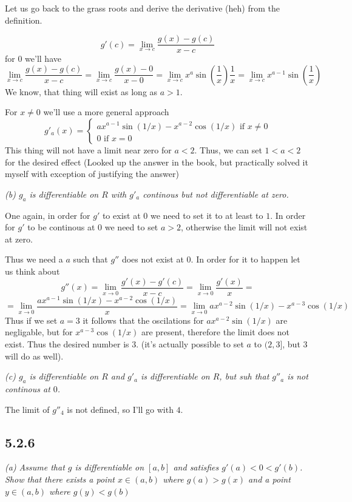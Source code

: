 \documentclass[11pt,oneside,titlepage]{book}
\begin{document}
Let us go back to the grass roots and derive the derivative (heh) from the
definition.

$$g'(c) = \lim_{x \to c}\frac{g(x) - g(c)}{x - c}$$
for 0 we'll have
$$\lim_{x \to c}\frac{g(x) - g(c)}{x - c} =
\lim_{x \to c}\frac{g(x) - 0}{x - 0} =
\lim_{x \to c}x^a\sin(\frac{1}{x}) \frac{1}{x} =
\lim_{x \to c}x^{a - 1}\sin(\frac{1}{x}) $$
We know, that thing will exist as long as $a > 1$.

For $x \neq 0$ we'll use a more general approach
\begin{equation}
  g'_a(x) =
  \begin{cases}
    ax^{a - 1} \sin(1/x) - x^{a - 2}\cos(1/x) \text{ if } x \neq 0 \\
    0 \text{ if } x = 0
  \end{cases}
\end{equation}
This thing will not have a limit near zero for $a < 2$. Thus,
we can set $1 < a <2 $ for the desired effect (Looked up the answer in the
book, but practically solved it myself with exception of justifying
the answer)

\textit{(b) $g_a$ is differentiable on $R$ with $g'_a$ continous but not
  differentiable at zero.}

One again, in order for $g'$ to exist at $0$ we need to set it to at least to
$1$. In order for $g'$ to be continous at $0$ we need to set $a > 2$,
otherwise the limit will not exist at zero.

Thus we need a $a$ such that $g''$ does not exist at $0$. In order for it to
happen let us think about
$$g''(x) = \lim_{x \to 0} \frac{g'(x) - g'(c)}{x - c} =
\lim_{x \to 0} \frac{g'(x)}{x} =
$$
$$= \lim_{x \to 0} \frac{ax^{a - 1} \sin(1/x) - x^{a - 2}\cos(1/x)}{x} =
\lim_{x \to 0} ax^{a - 2} \sin(1/x) - x^{a - 3}\cos(1/x) $$
Thus if we set $a = 3$ it follows that the oscilations for
$ax^{a - 2} \sin(1/x)$ are negligable, but for $x^{a - 3}\cos(1/x)$
are present, therefore the limit does not exist. Thus the desired number is
$3$. (it's actually possible to set $a$ to $(2, 3]$, but 3 will do as well).

\textit{(c) $g_a$ is differentiable on $R$ and $g'_a$ is differentiable on
  $R$, but suh that $g''_a$ is not continous at $0$.}

The limit of $g''_4$ is not defined, so I'll go with $4$.

\subsection*{5.2.6}
\textit{(a) Assume that $g$ is differentiable on $[a, b]$ and satisfies
  $g'(a) < 0 < g'(b)$. Show that there exists a point $x \in (a, b)$ where
  $g(a) > g(x)$ and a point $y \in (a, b)$ where $g(y) < g(b)$}
\end{document}
